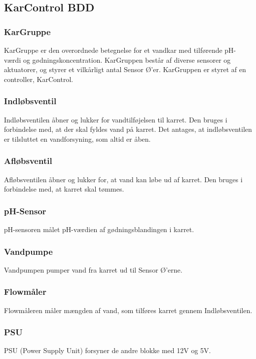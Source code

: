 
\subsection{KarControl BDD}

\subsubsection{KarGruppe}
KarGruppe er den overordnede betegnelse for et vandkar med tilførende pH-værdi og gødningskoncentration. KarGruppen består af diverse sensorer og aktuatorer, og styrer et vilkårligt antal Sensor Ø’er. KarGruppen er styret af en controller, KarControl.

\subsubsection{Indløbsventil}
Indløbsventilen åbner og lukker for vandtilføjelsen til karret. Den bruges i forbindelse med, at der skal fyldes vand på karret. Det antages, at indløbsventilen er tilsluttet en vandforsyning, som altid er åben.

\subsubsection{Afløbsventil}
Afløbsventilen åbner og lukker for, at vand kan løbe ud af karret. Den bruges i forbindelse med, at karret skal tømmes.

\subsubsection{pH-Sensor}
pH-sensoren målet pH-værdien af gødningsblandingen i karret.

\subsubsection{Vandpumpe}
Vandpumpen pumper vand fra karret ud til Sensor Ø’erne.

\subsubsection{Flowmåler}
Flowmåleren måler mængden af vand, som tilføres karret gennem Indløbsventilen.

\subsubsection{PSU}
PSU (Power Supply Unit) forsyner de andre blokke med 12V og 5V.


